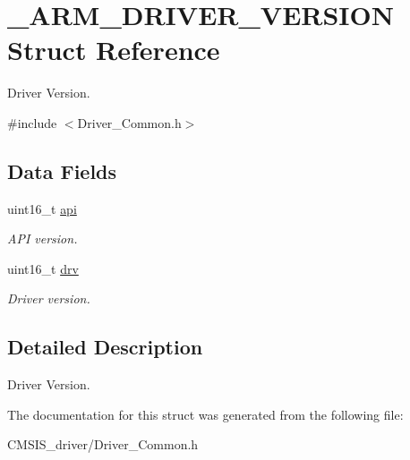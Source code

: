 \hypertarget{struct___a_r_m___d_r_i_v_e_r___v_e_r_s_i_o_n}{}\section{\+\_\+\+A\+R\+M\+\_\+\+D\+R\+I\+V\+E\+R\+\_\+\+V\+E\+R\+S\+I\+ON Struct Reference}
\label{struct___a_r_m___d_r_i_v_e_r___v_e_r_s_i_o_n}


Driver Version.  




{\ttfamily \#include $<$Driver\+\_\+\+Common.\+h$>$}

\subsection*{Data Fields}
\begin{DoxyCompactItemize}
\item 
\mbox{\label{struct___a_r_m___d_r_i_v_e_r___v_e_r_s_i_o_n_ad180da20fbde1d3dafc074af87c19540}} 
uint16\+\_\+t \mbox{\hyperlink{struct___a_r_m___d_r_i_v_e_r___v_e_r_s_i_o_n_ad180da20fbde1d3dafc074af87c19540}{api}}
\begin{DoxyCompactList}\small\item\em A\+PI version. \end{DoxyCompactList}\item 
\mbox{\label{struct___a_r_m___d_r_i_v_e_r___v_e_r_s_i_o_n_adcd153bc4507926c792e86ebe74e6455}} 
uint16\+\_\+t \mbox{\hyperlink{struct___a_r_m___d_r_i_v_e_r___v_e_r_s_i_o_n_adcd153bc4507926c792e86ebe74e6455}{drv}}
\begin{DoxyCompactList}\small\item\em Driver version. \end{DoxyCompactList}\end{DoxyCompactItemize}


\subsection{Detailed Description}
Driver Version. 

The documentation for this struct was generated from the following file\+:\begin{DoxyCompactItemize}
\item 
C\+M\+S\+I\+S\+\_\+driver/Driver\+\_\+\+Common.\+h\end{DoxyCompactItemize}
